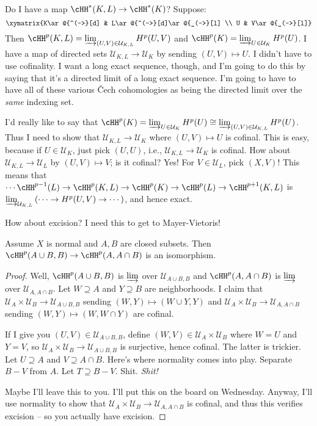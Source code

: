 \begin{example}
Do I have a map $\cHH^\ast(K,L)\to\cHH^\ast(K)$? Suppose:
\begin{equation*}
\xymatrix{K\ar@{^(->}[d] & L\ar@{^(->}[d]\ar@{_(->}[l] \\ U & V\ar@{_(->}[l]}
\end{equation*}
Then $\cHH^p(K,L)=\varinjlim_{(U,V)\in\mathcal{U}_{K,L}}H^p(U,V)$ and $\cHH^p(K)=\varinjlim_{U\in\mathcal{U}_K}H^p(U)$. I have a map of directed sets $\mathcal{U}_{K,L}\to\mathcal{U}_K$ by sending $(U,V)\mapsto U$. I didn't have to use cofinality. I want a long exact sequence, though, and I'm going to do this by saying that it's a directed limit of a long exact sequence. I'm going to have to have all of these various \v{C}ech cohomologies as being the directed limit over the \emph{same} indexing set.

I'd really like to say that $\cHH^p(K)=\varinjlim_{U\in\mathcal{U}_K}H^p(U)\cong \varinjlim_{(U,V)\in\mathcal{U}_{K,L}}H^p(U)$. Thus I need to show that $\mathcal{U}_{K,L}\to\mathcal{U}_K$ where $(U,V)\mapsto U$ is cofinal. This is easy, because if $U\in\mathcal{U}_K$, just pick $(U,U)$, i.e., $\mathcal{U}_{K,L}\to\mathcal{U}_K$ is cofinal. How about $\mathcal{U}_{K,L}\to\mathcal{U}_L$ by $(U,V)\mapsto V$; is it cofinal? Yes! For $V\in\mathcal{U}_L$, pick $(X,V)$! This means that $\cdots\cHH^{p-1}(L)\to\cHH^p(K,L)\to\cHH^p(K)\to\cHH^p(L)\to\cHH^{p+1}(K,L)$ is $\varinjlim_{\mathcal{U}_{K,L}}\left(\cdots\to H^{p}(U,V)\to\cdots\right)$, and hence exact.
\end{example}
How about excision? I need this to get to Mayer-Vietoris!
\begin{lemma}
Assume $X$ is normal and $A,B$ are closed subsets. Then $\cHH^p(A\cup B,B)\to\cHH^p(A,A\cap B)$ is an isomorphism. 
\end{lemma}
\begin{proof}
Well, $\cHH^p(A\cup B,B)$ is $\varinjlim$ over $\mathcal{U}_{A\cup B,B}$ and $\cHH^p(A,A\cap B)$ is $\varinjlim$ over $\mathcal{U}_{A,A\cap B}$. Let $W\supseteq A$ and $Y\supseteq B$ are neighborhoods. I claim that $\mathcal{U}_A\times\mathcal{U}_B\to\mathcal{U}_{A\cup B,B}$ sending $(W,Y)\mapsto (W\cup Y,Y)$ and $\mathcal{U}_A\times\mathcal{U}_B\to\mathcal{U}_{A,A\cap B}$ sending $(W,Y)\mapsto (W,W\cap Y)$ are cofinal.

If I give you $(U,V)\in \mathcal{U}_{A\cup B,B}$, define $(W,V)\in\mathcal{U}_A\times\mathcal{U}_B$ where $W=U$ and $Y=V$, so $\mathcal{U}_A\times\mathcal{U}_B\to\mathcal{U}_{A\cup B,B}$ is surjective, hence cofinal. The latter is trickier. Let $U\supseteq A$ and $V\supseteq A\cap B$. Here's where normality comes into play. Separate $B-V$ from $A$. Let $T\supseteq B-V$. Shit. \emph{Shit!}

Maybe I'll leave this to you. I'll put this on the board on Wednesday. Anyway, I'll use normality to show that $\mathcal{U}_A\times\mathcal{U}_B\to\mathcal{U}_{A,A\cap B}$ is cofinal, and thus this verifies excision -- so you actually have excision.
\end{proof}



